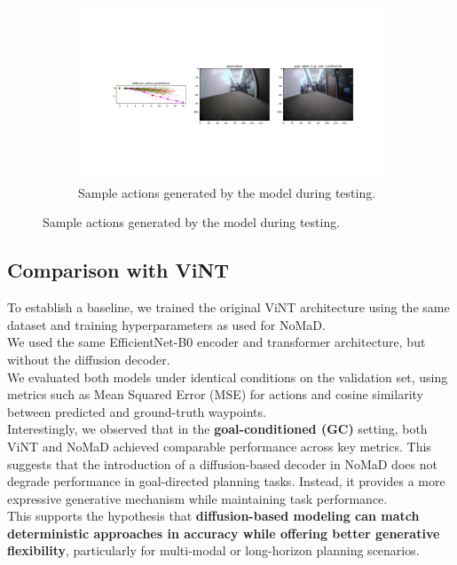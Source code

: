 \documentclass[12pt]{article}
\begin{document}
\begin{figure}[H]
\begin{subfigure}[b]{0.48\textwidth}
        \includegraphics[width=\textwidth]{images/sacson_test_action_samples_3.png}
        \caption{Sample actions generated by the model during testing.}
        \label{fig:sacon_test_action_samples_3}
    \end{subfigure}
\end{figure}

\subsection*{Comparison with ViNT}
To establish a baseline, we trained the original ViNT architecture using the same dataset and training hyperparameters as used for NoMaD.\\
We used the same EfficientNet-B0 encoder and transformer architecture, but without the diffusion decoder.\\
We evaluated both models under identical conditions on the validation set, using metrics such as Mean Squared Error (MSE) for actions and cosine similarity between predicted and ground-truth waypoints.\\
Interestingly, we observed that in the \textbf{goal-conditioned (GC)} setting, both ViNT and NoMaD achieved comparable performance across key metrics. This suggests that the introduction of a diffusion-based decoder in NoMaD does not degrade performance in goal-directed planning tasks. Instead, it provides a more expressive generative mechanism while maintaining task performance.\\
This supports the hypothesis that \textbf{diffusion-based modeling can match deterministic approaches in accuracy while offering better generative flexibility}, particularly for multi-modal or long-horizon planning scenarios.\\
\end{document}
